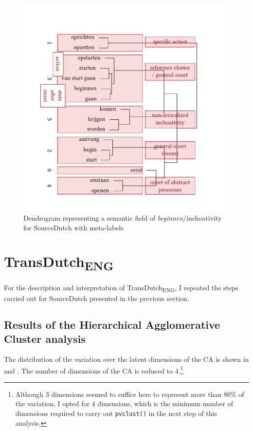 \begin{figure}
\includegraphics[width=\textwidth]{figures/tree62.pdf}
\caption{\label{fig:4:61b}Dendrogram representing a semantic field of \textit{beginnen}/inchoativity for SourceDutch with meta-labels}
\end{figure}

\section{TransDutch\textsubscript{ENG}}
\label{sec:4.3}  
For the description and interpretation of TransDutch\textsubscript{ENG}, I repeated the steps carried out for SourceDutch presented in the previous section.

\subsection{Results of the Hierarchical Agglomerative Cluster analysis}
\label{sec:4.3.1}  
The distribution of the variation over the latent dimensions of the CA is shown in  and . The number of dimensions of the CA is reduced to 4.\footnote{Although 3 dimensions seemed to suffice here to represent more than 80\% of the variation, I opted for 4 dimensions, which is the minimum number of dimensions required to carry out \texttt{pvclust()} in the next step of this analysis.}



